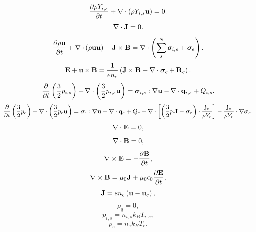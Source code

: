 \documentclass[a4paper,11pt]{report}
\begin{document}
\begin{equation}
    \label{eq:sf_1ionvel_ni}
    \frac{\partial \rho Y_{i,s}}{\partial t} + \nabla \cdot \left( \rho Y_{i,s} \mathbf{u} \right) = 0.
\end{equation}
\begin{equation}
    \label{eq:sf_1ionvel_ne}
    \nabla \cdot \mathbf{J} = 0.
\end{equation}
\begin{equation}
    \label{eq:sf_1ionvel_ui}
    \frac{\partial \rho \mathbf{u}}{\partial t} + \nabla \cdot \left( \rho \mathbf{u} \mathbf{u} \right) - \mathbf{J} \times \mathbf{B} = \nabla \cdot \left( \sum_s^N \bm \sigma_{i,s} + \bm \sigma_e \right).
\end{equation}
\begin{equation}
    \label{eq:sf_1ionvel_ue}
    \mathbf{E} + \mathbf{u} \times \mathbf{B} = \frac{1}{e n_e} \left( \mathbf{J} \times \mathbf{B} + \nabla \cdot \bm \sigma_e + \mathbf{R}_e \right) .
\end{equation}
\begin{equation}
    \label{eq:sf_1ionvel_iei}
    \frac{\partial}{\partial t} \left( \frac{3}{2} p_{i,s} \right) + \nabla \cdot \left( \frac{3}{2} p_{i,s} \mathbf{u} \right) = \bm \sigma_{i,s} : \nabla \mathbf{u} - \nabla \cdot \mathbf{q}_{i,s} + Q_{i,s}.
\end{equation}
\begin{equation}
    \label{eq:sf_1ionvel_iee}
    \frac{\partial}{\partial t} \left( \frac{3}{2} p_e \right) + \nabla \cdot \left( \frac{3}{2} p_e \mathbf{u} \right) = \bm \sigma_e : \nabla \mathbf{u} - \nabla \cdot \mathbf{q}_e + Q_e - \nabla \cdot \left[ \left( \frac{3}{2} p_e \mathbf{I} - \bm \sigma_e \right) \cdot \frac{\mathbf{j}_e}{\rho Y_e}  \right] - \frac{\mathbf{j}_e}{\rho Y_e} \cdot \nabla \bm \sigma_e.
\end{equation}
\begin{equation}
    \label{eq:sf_1ionvel_maxwell_3}
    \nabla \cdot \mathbf{E} = 0,
\end{equation}
\begin{equation}
    \label{eq:sf_1ionvel_maxwell_4}
    \nabla \cdot \mathbf{B} = 0,
\end{equation}
\begin{equation}
    \label{eq:sf_1ionvel_maxwell_1}
    \nabla \times \mathbf{E} = -\frac{ \partial \mathbf{B}}{\partial t},
\end{equation}
\begin{equation}
    \label{eq:sf_1ionvel_maxwell_2}
    \nabla \times \mathbf{B} = \mu_0 \mathbf{J} + \mu_0 \epsilon_0 \frac{\partial \mathbf{E}}{\partial t},
\end{equation}
\begin{equation}
    \label{eq:sf_1ionvel_curr_density}
    \mathbf{J} = e n_e \left( \mathbf{u} - \mathbf{u}_e \right),
\end{equation}
\begin{equation}
    \label{eq:sf_1ionvel_mass_density}
    \rho_q = 0,
\end{equation}
\begin{equation}
    \label{eq:sf_1ionvel_eos_ion}
    p_{i,s} = n_{i,s} k_B T_{i,s},
\end{equation}
\begin{equation}
    \label{eq:sf_1ionvel_eos_elec}
    p_e = n_e k_B T_e.
\end{equation}
\end{document}
